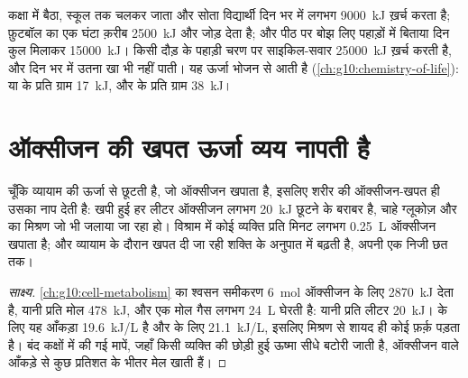 \begin{example}[रोज़ के बजट]\label{ex:g10:exercise-and-energy:budgets}
कक्षा में बैठा, स्कूल तक चलकर जाता और सोता विद्यार्थी दिन भर में लगभग
\qty{9000}{kJ} ख़र्च करता है; फ़ुटबॉल का एक घंटा क़रीब \qty{2500}{kJ} और
जोड़ देता है; और पीठ पर बोझ लिए पहाड़ों में बिताया दिन कुल मिलाकर
\qty{15000}{kJ}। किसी दौड़ के पहाड़ी चरण पर साइकिल-सवार \qty{25000}{kJ}
ख़र्च करती है, और दिन भर में उतना खा भी नहीं पाती। यह ऊर्जा भोजन से आती
है (\cref{ch:g10:chemistry-of-life}):  या  के प्रति
ग्राम \qty{17}{kJ}, और  के प्रति ग्राम \qty{38}{kJ}।
\end{example}

\section{ऑक्सीजन की खपत ऊर्जा व्यय नापती है}

\begin{proposition}[ऑक्सीजन तुल्यांक]\label{prop:g10:exercise-and-energy:oxygen}
चूँकि व्यायाम की ऊर्जा  से छूटती है, जो ऑक्सीजन खपाता है,
इसलिए शरीर की ऑक्सीजन-खपत ही उसका  नाप देती है: खपी हुई हर लीटर
ऑक्सीजन लगभग \qty{20}{kJ} छूटने के बराबर है, चाहे ग्लूकोज़ और  का
मिश्रण जो भी जलाया जा रहा हो। विश्राम में कोई व्यक्ति प्रति मिनट लगभग
\qty{0.25}{L} ऑक्सीजन खपाता है; और व्यायाम के दौरान खपत दी जा रही शक्ति
के अनुपात में बढ़ती है, अपनी एक निजी छत तक।
\end{proposition}
\begin{proof}[साक्ष्य]
\cref{ch:g10:cell-metabolism} का श्वसन समीकरण \qty{6}{mol} ऑक्सीजन के
लिए \qty{2870}{kJ} देता है, यानी प्रति मोल \qty{478}{kJ}, और एक मोल गैस
लगभग \qty{24}{L} घेरती है: यानी प्रति लीटर \qty{20}{kJ}।  के लिए यह
आँकड़ा \qty{19.6}{kJ/L} है और  के लिए \qty{21.1}{kJ/L},
इसलिए मिश्रण से शायद ही कोई फ़र्क़ पड़ता है। बंद कक्षों में की गई
मापें, जहाँ किसी व्यक्ति की छोड़ी हुई ऊष्मा सीधे बटोरी जाती है, ऑक्सीजन
वाले आँकड़े से कुछ प्रतिशत के भीतर मेल खाती हैं।
\end{proof}

